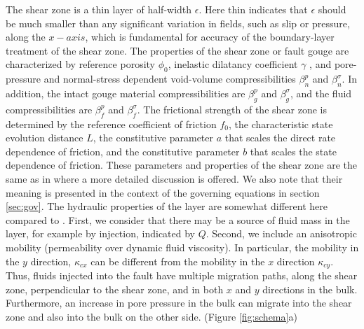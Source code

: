 \documentclass[draft]{agujournal2019}
\begin{document}
The shear zone is a thin layer of half-width $\epsilon$. Here thin indicates that $\epsilon$ should be much smaller than any significant variation in fields, such as slip or pressure, along the $x-axis$, which is fundamental for accuracy of the boundary-layer treatment of the shear zone. The properties of the shear zone or fault gouge are characterized by reference porosity $\phi_0$, inelastic dilatancy coefficient $\gamma$ \cite{Segall1995}, and pore-pressure and normal-stress dependent void-volume compressibilities $\beta_n^p$ and $\beta_n^\sigma$. In addition, the intact gouge material compressibilities are $\beta_g^p$ and $\beta_g^\sigma$, and the fluid compressibilities are  $\beta_f^p$ and $\beta_f^\sigma$. The frictional strength of the shear zone is determined by the reference coefficient of friction $f_0$, the characteristic state evolution distance $L$, the constitutive parameter $a$ that scales the direct rate dependence of friction, and the constitutive parameter $b$ that scales the state dependence of friction. These parameters and properties of the shear zone are the same as in  where a more detailed discussion is offered. We also note that their meaning is presented in the context of the governing equations in section \ref{sec:gov}. The hydraulic properties of the layer are somewhat different here compared to . First, we consider that there may be a source of fluid mass in the layer, for example by injection, indicated by $Q$. Second, we include an anisotropic mobility (permeability over dynamic fluid viscosity). In particular, the mobility in the $y$ direction, $\kappa_{cx}$ can be different from the mobility in the $x$ direction $\kappa_{cy}$. Thus, fluids injected into the fault have multiple migration paths, along the shear zone, perpendicular to the shear zone, and in both $x$ and $y$ directions in the bulk. Furthermore, an increase in pore pressure in the bulk can migrate into the shear zone and also into the bulk on the other side.
(Figure \ref{fig:schema}a)
\end{document}
